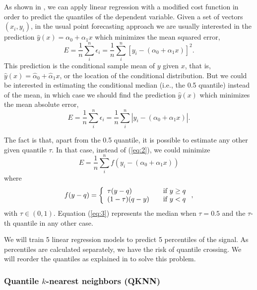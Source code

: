 \documentclass[a4paper,3p,sort&compress]{elsarticle}
\begin{document}
As shown in \cite{koenker_quantile_2001}, we can apply linear
regression with a modified cost function in order to predict the
quantiles of the dependent variable.  Given a set of vectors
$(x_i, y_i)$, in the usual point forecasting approach we are usually
interested in the prediction $\hat y(x) = \alpha_0 + \alpha_1 x$ which
minimizes the mean squared error,
\begin{equation}
  \label{eq:1}
  E = \frac{1}{n} \sum^n_i \epsilon_i =
  \frac{1}{n} \sum^n_i [ y_i - (\alpha_0 + \alpha_1 x) ]^2.
\end{equation}
This prediction is the conditional sample mean of $y$ given $x$, that
is, $\hat y(x) = \hat\alpha_0 + \hat\alpha_1 x$, or the location of
the conditional distribution. But we could be interested in estimating
the conditional median (i.e., the 0.5 quantile) instead of the mean,
in which case we should find the prediction $\hat y(x)$ which
minimizes the mean absolute error,
\begin{equation}
  \label{eq:2}
  E = \frac{1}{n} \sum^n_i \epsilon_i =
  \frac{1}{n} \sum^n_i | y_i - (\alpha_0 + \alpha_1 x) |.
\end{equation}

The fact is that, apart from the 0.5 quantile, it is possible to
estimate any other given quantile $\tau$. In that case, instead of
(\ref{eq:2}), we could minimize
\begin{equation}
  \label{eq:3}
  E= \frac{1}{n} \sum^n_i f( y_i - (\alpha_0 + \alpha_1 x))
\end{equation}
where
\begin{equation}
  \label{eq:4}
  f(y-q) = \left\{ 
    \begin{array}{l l}
      \tau (y-q) & \quad \mbox{if $y \ge q$}\\
      (1-\tau) (q-y) & \quad \mbox{if $y < q$}\\
    \end{array} \right.,
\end{equation}
with $\tau \in (0,1)$. Equation (\ref{eq:3}) represents the median
when $\tau=0.5$ and the $\tau$-th quantile in any other case.

We will train 5 linear regression models to predict 5 percentiles of
the signal. As percentiles are calculated separately, we have the risk
of quantile crossing.  We will reorder the quantiles as explained in
\cite{cross} to solve this problem.

\subsubsection{Quantile $k$-nearest neighbors (QKNN)}
\end{document}
